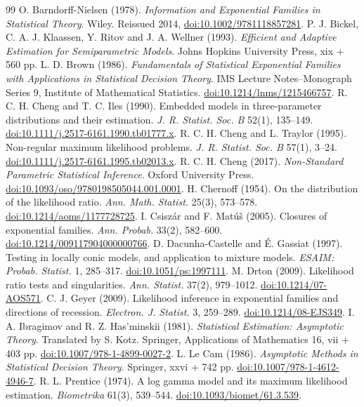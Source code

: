 \documentclass[11pt]{article}
\newcommand{\doi}[1]{\href{https://doi.org/#1}{doi:#1}}
\theoremstyle{definition}
\theoremstyle{remark}
\begin{document}
\begin{thebibliography}{99}\small
{} O. Barndorff-Nielsen (1978).
\emph{Information and Exponential Families in Statistical Theory}. Wiley.
Reissued 2014, \doi{10.1002/9781118857281}.
 P. J. Bickel, C. A. J. Klaassen, Y. Ritov and J. A. Wellner (1993).
\emph{Efficient and Adaptive Estimation for Semiparametric Models}.
Johns Hopkins University Press, xix + 560 pp.
 L. D. Brown (1986).
\emph{Fundamentals of Statistical Exponential Families with Applications in
Statistical Decision Theory}. IMS Lecture Notes--Monograph Series 9,
Institute of Mathematical Statistics. \doi{10.1214/lnms/1215466757}.
 R. C. H. Cheng and T. C. Iles (1990).
Embedded models in three-parameter distributions and their estimation.
\emph{J. R. Statist. Soc. B} 52(1), 135--149.
\doi{10.1111/j.2517-6161.1990.tb01777.x}.
 R. C. H. Cheng and L. Traylor (1995).
Non-regular maximum likelihood problems.
\emph{J. R. Statist. Soc. B} 57(1), 3--24.
\doi{10.1111/j.2517-6161.1995.tb02013.x}.
 R. C. H. Cheng (2017).
\emph{Non-Standard Parametric Statistical Inference}. Oxford University Press.
\doi{10.1093/oso/9780198505044.001.0001}.
 H. Chernoff (1954). On the distribution of the likelihood ratio.
\emph{Ann. Math. Statist.} 25(3), 573--578. \doi{10.1214/aoms/1177728725}.
 I. Csisz\'ar and F. Mat\'u\v s (2005).
Closures of exponential families. \emph{Ann. Probab.} 33(2), 582--600.
\doi{10.1214/009117904000000766}.
 D. Dacunha-Castelle and \'E. Gassiat (1997).
Testing in locally conic models, and application to mixture models.
\emph{ESAIM: Probab. Statist.} 1, 285--317. \doi{10.1051/ps:1997111}.
 M. Drton (2009). Likelihood ratio tests and singularities.
\emph{Ann. Statist.} 37(2), 979--1012. \doi{10.1214/07-AOS571}.
 C. J. Geyer (2009). Likelihood inference in exponential families
and directions of recession. \emph{Electron. J. Statist.} 3, 259--289.
\doi{10.1214/08-EJS349}.
 I. A. Ibragimov and R. Z. Has'minskii (1981).
\emph{Statistical Estimation: Asymptotic Theory}. Translated by S. Kotz.
Springer, Applications of Mathematics 16, vii + 403 pp.
\doi{10.1007/978-1-4899-0027-2}.
 L. Le Cam (1986).
\emph{Asymptotic Methods in Statistical Decision Theory}. Springer,
xxvi + 742 pp. \doi{10.1007/978-1-4612-4946-7}.
 R. L. Prentice (1974).
A log gamma model and its maximum likelihood estimation.
\emph{Biometrika} 61(3), 539--544. \doi{10.1093/biomet/61.3.539}.

\end{thebibliography}
\end{document}
